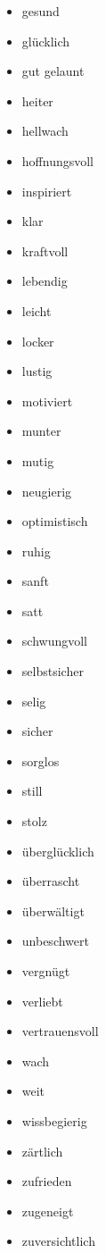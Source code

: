 \begin{multicols}{2}
\begin{itemize}
    \item gesund
    \item glücklich
    \item gut gelaunt
    \item heiter
    \item hellwach
    \item hoffnungsvoll
    \item inspiriert
    \item klar
    \item kraftvoll
    \item lebendig
    \item leicht
    \item locker
    \item lustig
    \item motiviert
    \item munter
    \item mutig
    \item neugierig
    \item optimistisch
    \item ruhig
    \item sanft
    \item satt
    \item schwungvoll
    \item selbstsicher
    \item selig
    \item sicher
    \item sorglos
    \item still
    \item stolz
    \item überglücklich
    \item überrascht
    \item überwältigt
    \item unbeschwert
    \item vergnügt
    \item verliebt
    \item vertrauensvoll
    \item wach
    \item weit
    \item wissbegierig
    \item zärtlich
    \item zufrieden
    \item zugeneigt
    \item zuversichtlich
  \end{itemize}
\end{multicols}

